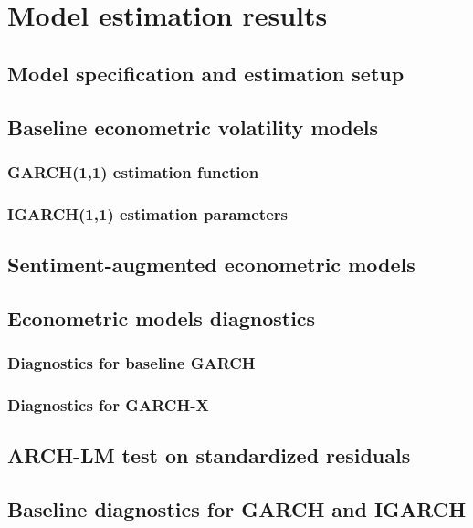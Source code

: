 \documentclass[12pt]{report}
\begin{document}
\section{Model estimation results}
\subsection{Model specification and estimation setup}

\subsection{Baseline econometric volatility models}
\subsubsection{GARCH(1,1) estimation function}

\subsubsection{IGARCH(1,1) estimation parameters}

\subsection{Sentiment-augmented econometric models}

\subsection{Econometric models diagnostics}
\subsubsection{Diagnostics for baseline GARCH}

\subsubsection{Diagnostics for GARCH-X}

\subsection{ARCH-LM test on standardized residuals}

\subsection{Baseline diagnostics for GARCH and IGARCH}

\end{document}
